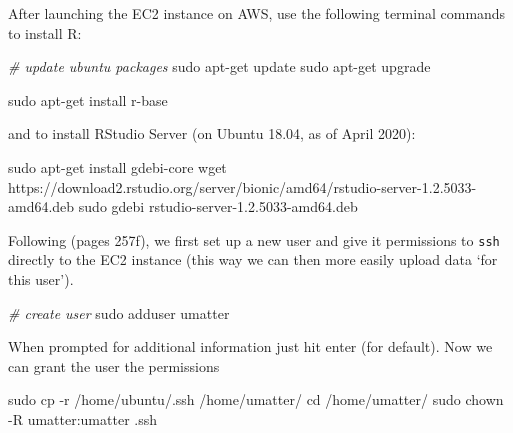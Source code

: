 \documentclass[
  12pt,
]{style/krantz}
\newenvironment{Shaded}{\begin{snugshade}}{\end{snugshade}}
\newcommand{\AttributeTok}[1]{\textcolor[rgb]{0.77,0.63,0.00}{#1}}
\newcommand{\BuiltInTok}[1]{#1}
\newcommand{\CommentTok}[1]{\textcolor[rgb]{0.56,0.35,0.01}{\textit{#1}}}
\newcommand{\FunctionTok}[1]{\textcolor[rgb]{0.00,0.00,0.00}{#1}}
\newcommand{\NormalTok}[1]{#1}
\begin{document}
After launching the EC2 instance on AWS, use the following terminal commands to install R:

\begin{Shaded}
\begin{Highlighting}[]
\CommentTok{\# update ubuntu packages}
 \FunctionTok{sudo}\NormalTok{ apt{-}get update}
 \FunctionTok{sudo}\NormalTok{ apt{-}get upgrade}
\end{Highlighting}
\end{Shaded}

\begin{Shaded}
\begin{Highlighting}[]
\FunctionTok{sudo}\NormalTok{ apt{-}get install r{-}base}
\end{Highlighting}
\end{Shaded}

and to install RStudio Server (on Ubuntu 18.04, as of April 2020):

\begin{Shaded}
\begin{Highlighting}[]
\FunctionTok{sudo}\NormalTok{ apt{-}get install gdebi{-}core}
\FunctionTok{wget}\NormalTok{ https://download2.rstudio.org/server/bionic/amd64/rstudio{-}server{-}1.2.5033{-}amd64.deb}
\FunctionTok{sudo}\NormalTok{ gdebi rstudio{-}server{-}1.2.5033{-}amd64.deb}
\end{Highlighting}
\end{Shaded}

Following \citet{walkowiak_2016} (pages 257f), we first set up a new user and give it permissions to \texttt{ssh} directly to the EC2 instance (this way we can then more easily upload data `for this user').

\begin{Shaded}
\begin{Highlighting}[]
\CommentTok{\# create user}
\FunctionTok{sudo}\NormalTok{ adduser umatter }
\end{Highlighting}
\end{Shaded}

When prompted for additional information just hit enter (for default). Now we can grant the user the permissions

\begin{Shaded}
\begin{Highlighting}[]
\FunctionTok{sudo}\NormalTok{ cp }\AttributeTok{{-}r}\NormalTok{ /home/ubuntu/.ssh /home/umatter/}
\BuiltInTok{cd}\NormalTok{ /home/umatter/}
\FunctionTok{sudo}\NormalTok{ chown }\AttributeTok{{-}R}\NormalTok{ umatter:umatter .ssh}
\end{Highlighting}
\end{Shaded}
\end{document}
